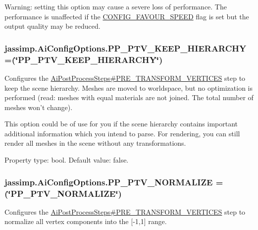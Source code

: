 Warning\+: setting this option may cause a severe loss of performance. The performance is unaffected if the \hyperlink{}{C\+O\+N\+F\+I\+G\+\_\+\+F\+A\+V\+O\+U\+R\+\_\+\+S\+P\+E\+E\+D} flag is set but the output quality may be reduced. \hypertarget{enumjassimp_1_1_ai_config_options_a85db3bbe3bfcffb5365fddd9a6e0894a}{
\subsubsection[{P\+P\+\_\+\+P\+T\+V\+\_\+\+K\+E\+E\+P\+\_\+\+H\+I\+E\+R\+A\+R\+C\+H\+Y}]{\setlength{\rightskip}{0pt plus 5cm}jassimp.\+Ai\+Config\+Options.\+P\+P\+\_\+\+P\+T\+V\+\_\+\+K\+E\+E\+P\+\_\+\+H\+I\+E\+R\+A\+R\+C\+H\+Y =(\char`\"{}P\+P\+\_\+\+P\+T\+V\+\_\+\+K\+E\+E\+P\+\_\+\+H\+I\+E\+R\+A\+R\+C\+H\+Y\char`\"{})}}\label{enumjassimp_1_1_ai_config_options_a85db3bbe3bfcffb5365fddd9a6e0894a}
Configures the \hyperlink{enumjassimp_1_1_ai_post_process_steps_adf545ba757faa81c1c1dd687a5525d67}{Ai\+Post\+Process\+Steps\#\+P\+R\+E\+\_\+\+T\+R\+A\+N\+S\+F\+O\+R\+M\+\_\+\+V\+E\+R\+T\+I\+C\+E\+S} step to keep the scene hierarchy. Meshes are moved to worldspace, but no optimization is performed (read\+: meshes with equal materials are not joined. The total number of meshes won't change).

This option could be of use for you if the scene hierarchy contains important additional information which you intend to parse. For rendering, you can still render all meshes in the scene without any transformations.

Property type\+: bool. Default value\+: false. \hypertarget{enumjassimp_1_1_ai_config_options_a62756ef9d485863cccb64bba66fdc211}{
\subsubsection[{P\+P\+\_\+\+P\+T\+V\+\_\+\+N\+O\+R\+M\+A\+L\+I\+Z\+E}]{\setlength{\rightskip}{0pt plus 5cm}jassimp.\+Ai\+Config\+Options.\+P\+P\+\_\+\+P\+T\+V\+\_\+\+N\+O\+R\+M\+A\+L\+I\+Z\+E =(\char`\"{}P\+P\+\_\+\+P\+T\+V\+\_\+\+N\+O\+R\+M\+A\+L\+I\+Z\+E\char`\"{})}}\label{enumjassimp_1_1_ai_config_options_a62756ef9d485863cccb64bba66fdc211}
Configures the \hyperlink{enumjassimp_1_1_ai_post_process_steps_adf545ba757faa81c1c1dd687a5525d67}{Ai\+Post\+Process\+Steps\#\+P\+R\+E\+\_\+\+T\+R\+A\+N\+S\+F\+O\+R\+M\+\_\+\+V\+E\+R\+T\+I\+C\+E\+S} step to normalize all vertex components into the \mbox{[}-\/1,1\mbox{]} range.

